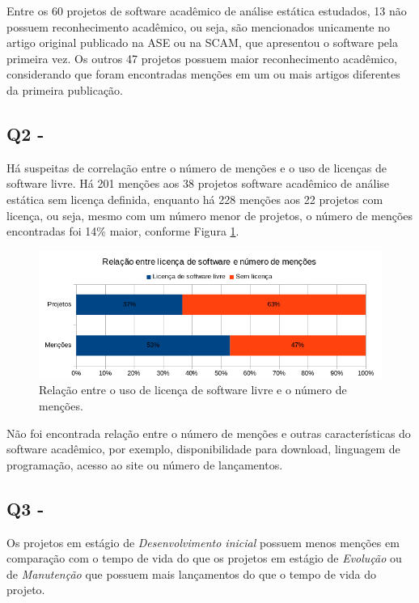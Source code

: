 Entre os 60 projetos de software acadêmico de análise estática estudados, 
13 não possuem reconhecimento acadêmico, ou seja, são
mencionados unicamente no artigo original publicado na ASE ou na SCAM,
que apresentou o software pela primeira vez. 
Os outros 47 projetos possuem maior reconhecimento acadêmico, 
considerando que foram encontradas menções em um ou mais artigos
diferentes da primeira publicação.


\subsection{Q2 - \QuestaoDois} %

Há suspeitas de correlação entre o número de menções e o uso de licenças de
software livre. 
Há 201 menções aos 38 projetos software acadêmico de análise estática sem licença definida, 
enquanto há 228 menções aos 22 projetos com licença, ou seja, 
mesmo com um número menor de projetos, o número de menções encontradas foi 14\% maior, 
conforme Figura \ref{license-vs-mentions}.

\begin{figure}[ht]
  \center
  \includegraphics[scale=0.6]{imagens/license-vs-mentions.png}
  \caption{Relação entre o uso de licença de software livre e o número de menções.}
  \label{license-vs-mentions}
\end{figure}

Não foi encontrada relação entre o número de menções e 
outras características do software acadêmico, por exemplo,
disponibilidade para download, linguagem de programação, acesso ao site ou número
de lançamentos.

\subsection{Q3 - \QuestaoTres} %

Os projetos em estágio de {\it Desenvolvimento inicial} possuem menos menções em
comparação com o tempo de vida do que os
projetos em estágio de {\it Evolução} ou de {\it Manutenção} que
possuem mais lançamentos do que o tempo de vida do projeto.


